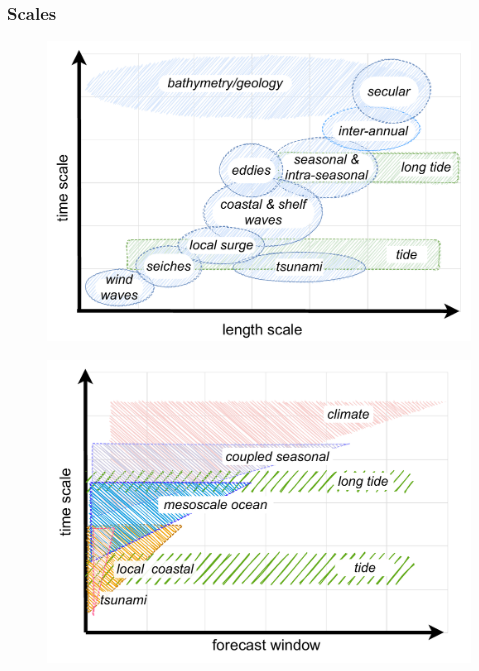\begin{frame}
\frametitle{Scales}
\begin{minipage}{0.45\textwidth}
    \begin{figure}      
    \includegraphics[width=\textwidth]{figures/diagrams/scales_time_length.pdf}
    \end{figure}
\end{minipage}
\hfill
\begin{minipage}{0.45\textwidth}
    \begin{figure}      
     \includegraphics[width=\textwidth]{figures/diagrams/scales.pdf}
    \end{figure} 
\end{minipage}
\end{frame}
